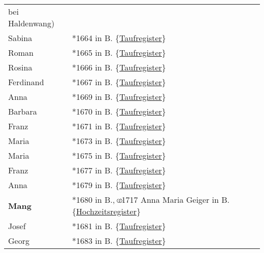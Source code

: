 \documentclass[
]{article}
\begin{document}
\begin{longtable}[]{@{}ll@{}}
bei Haldenwang) \\
Sabina & *1664 in B.
\{\href{https://data.matricula-online.eu/de/deutschland/augsburg/haldenwang-bei-kempten/1-T-1/?pg=72}{Taufregister}\} \\
Roman & *1665 in B.
\{\href{https://data.matricula-online.eu/de/deutschland/augsburg/haldenwang-bei-kempten/1-T-1/?pg=75}{Taufregister}\} \\
Rosina & *1666 in B.
\{\href{https://data.matricula-online.eu/de/deutschland/augsburg/haldenwang-bei-kempten/1-T-1/?pg=78}{Taufregister}\} \\
Ferdinand & *1667 in B.
\{\href{https://data.matricula-online.eu/de/deutschland/augsburg/haldenwang-bei-kempten/1-T-1/?pg=80}{Taufregister}\} \\
Anna & *1669 in B.
\{\href{https://data.matricula-online.eu/de/deutschland/augsburg/haldenwang-bei-kempten/1-T-2/?pg=4}{Taufregister}\} \\
Barbara & *1670 in B.
\{\href{https://data.matricula-online.eu/de/deutschland/augsburg/haldenwang-bei-kempten/1-T-2/?pg=7}{Taufregister}\} \\
Franz & *1671 in B.
\{\href{https://data.matricula-online.eu/de/deutschland/augsburg/haldenwang-bei-kempten/2-T/?pg=4}{Taufregister}\} \\
Maria & *1673 in B.
\{\href{https://data.matricula-online.eu/de/deutschland/augsburg/haldenwang-bei-kempten/2-T/?pg=7}{Taufregister}\} \\
Maria & *1675 in B.
\{\href{https://data.matricula-online.eu/de/deutschland/augsburg/haldenwang-bei-kempten/2-T/?pg=9}{Taufregister}\} \\
Franz & *1677 in B.
\{\href{https://data.matricula-online.eu/de/deutschland/augsburg/haldenwang-bei-kempten/2-T/?pg=12}{Taufregister}\} \\
Anna & *1679 in B.
\{\href{https://data.matricula-online.eu/de/deutschland/augsburg/haldenwang-bei-kempten/2-T/?pg=15}{Taufregister}\} \\
\textbf{Mang} & *1680 in B., ⚭1717 Anna Maria Geiger in B.
\{\href{https://data.matricula-online.eu/de/deutschland/augsburg/haldenwang-bei-kempten/2-T/?pg=12}{Hochzeitsregister}\} \\
Josef & *1681 in B.
\{\href{https://data.matricula-online.eu/de/deutschland/augsburg/haldenwang-bei-kempten/2-T/?pg=19}{Taufregister}\} \\
Georg & *1683 in B.
\{\href{https://data.matricula-online.eu/de/deutschland/augsburg/haldenwang-bei-kempten/2-T/?pg=22}{Taufregister}\} \\

\end{longtable}
\end{document}

